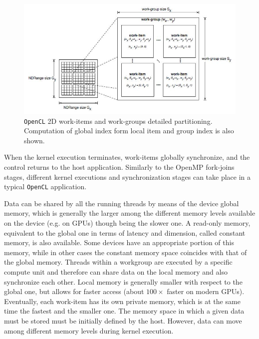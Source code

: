         \begin{figure}
    	\centering
    	\includegraphics[width=1.0\textwidth]{./images/parallel_programming/opencl_execmodel2d}
    	\caption{\texttt{OpenCL} 2D work-items and work-groups detailed partitioning. Computation of global index form local item and group index is also shown. }\label{fig:opencl_execmodel2d}
    \end{figure}
    When the kernel execution terminates,
    work-items globally synchronize, and the control returns to the
    host application. Similarly to the OpenMP fork-joins stages,
    different kernel executions and synchronization stages can take
    place in a typical \texttt{OpenCL} application.
    
    Data can be shared by all the running threads by means of the
    device global memory, which is generally the larger among the
    different memory levels available on the device (e.g. on GPUs)
    though being the slower one. A read-only memory, equivalent to the
    global one in terms of latency and dimension, called constant
    memory, is also available. Some devices have an appropriate
    portion of this memory, while in other cases the constant memory
    space coincides with that of the global memory. Threads within a
    workgroup are executed by a specific compute unit and therefore
    can share data on the local memory and also synchronize each
    other. Local memory is generally smaller with respect to the
    global one, but allows for faster access (about $100\times$ faster
    on modern GPUs). Eventually, each work-item has its own private
    memory, which is at the same time the fastest and the smaller
    one. The memory space in which a given data must be stored must be
    initially defined by the host. However, data can move among
    different memory levels during kernel execution.
    
